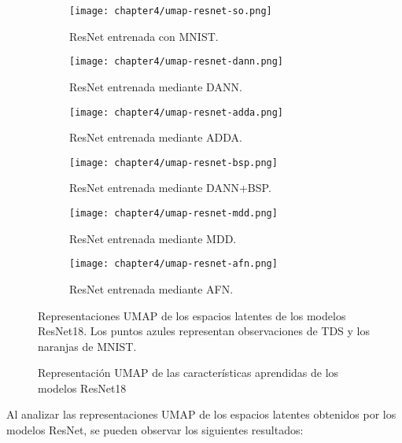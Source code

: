 \begin{figure}[H]
    \centering
    \begin{subfigure}[h]{0.40\textwidth}
        \texttt{[image: chapter4/umap-resnet-so.png]}
        \caption{ResNet entrenada con MNIST.}
        \label{fig:umap-resnet-so}
    \end{subfigure}
    \hfill
    \begin{subfigure}[h]{0.40\textwidth}
        \texttt{[image: chapter4/umap-resnet-dann.png]}
        \caption{ResNet entrenada mediante DANN.}
        \label{fig:umap-resnet-dann}
    \end{subfigure}
    \hfill
    \begin{subfigure}[h]{0.40\textwidth}
        \texttt{[image: chapter4/umap-resnet-adda.png]}
        \caption{ResNet entrenada mediante ADDA.}
        \label{fig:umap-resnet-adda}
    \end{subfigure}
    \hfill
    \begin{subfigure}[h]{0.40\textwidth}
        \texttt{[image: chapter4/umap-resnet-bsp.png]}
        \caption{ResNet entrenada mediante DANN+BSP.}
        \label{fig:umap-resnet-bsp}
    \end{subfigure}
    \hfill
    \begin{subfigure}[h]{0.40\textwidth}
        \texttt{[image: chapter4/umap-resnet-mdd.png]}
        \caption{ResNet entrenada mediante MDD.}
        \label{fig:umap-resnet-mdd}
    \end{subfigure}
    \hfill
    \begin{subfigure}[h]{0.40\textwidth}
        \texttt{[image: chapter4/umap-resnet-afn.png]}
        \caption{ResNet entrenada mediante AFN.}
        \label{fig:umap-resnet-afn}
    \end{subfigure}

    \caption{Representación UMAP de las características aprendidas de los modelos ResNet18}{Representaciones UMAP de los espacios latentes de los modelos ResNet18. Los puntos azules representan observaciones de TDS y los naranjas de MNIST.}
    \label{fig:umaps-resnet}
\end{figure}

Al analizar las representaciones UMAP de los espacios latentes obtenidos por los modelos ResNet, se pueden observar los
siguientes resultados:

